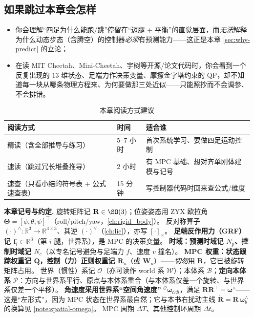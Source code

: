 \subsection*{如果跳过本章会怎样}
\begin{itemize}
  \item 你会理解“四足为什么能跑/跳”停留在“迈腿 + 平衡”的直觉层面，而\emph{无法}解释为什么动态步态（含腾空）的控制器\emph{必须}有预测能力——这正是本章 \cref{sec:why-predict} 的立论；
  \item 在读 MIT Cheetah、Mini-Cheetah、宇树等开源/论文代码时，你会看到一个反复出现的 $13$ 维状态、足端力作决策变量、摩擦金字塔约束的 QP，却不知道每一块从哪条物理方程来、为何要做那三处近似——只能照抄而不会调参、不会排错。
\end{itemize}

\begin{table}[H]\centering\small
\caption{本章阅读方式建议}
\begin{tabular}{lll}
\toprule
阅读方式 & 时间 & 适合谁 \\
\midrule
精读（含全部推导与练习） & 5--7 小时 & 首次系统学习、要做四足运动控制 \\
速读（跳过冗长堆叠推导） & 2 小时 & 有 MPC 基础、想对齐单刚体建模与记号 \\
速查（只看小结的符号表 + 公式速查表） & 15 分钟 & 写控制器代码时回来查公式/维度 \\
\bottomrule
\end{tabular}
\end{table}

\begin{note}
\textbf{本章记号与约定.}\;
旋转矩阵记 $\mathbf{R}\in\SO(3)$；位姿姿态用 ZYX 欧拉角 $\boldsymbol{\Theta}=[\phi,\theta,\psi]^\top$（roll/pitch/yaw，\cref{ch:rigid_body}）。
反对称算子 $(\cdot)^\wedge:\mathbb{R}^3\to\mathbb{R}^{3\times3}$、其逆 $(\cdot)^\vee$（\cref{ch:lie}），亦写 $[\cdot]_\times$。
\textbf{足端反作用力（GRF）记 $\mathbf{f}_i\in\mathbb{R}^3$}（第 $i$ 腿，世界系），是 MPC 的决策变量。
\textbf{时域：预测时域记 $N_p$、控制时域记 $N_c$}（以专名记号避免与足端力 $f$、速度 $v$ 撞名）。
\textbf{MPC 权重：状态跟踪权重记 $\mathbf{Q}$，控制（力）正则权重记 $\mathbf{R}_u$}（或 $\mathbf{W}_u$）——\emph{切勿}用 $\mathbf{R}$，它已被旋转矩阵占用。
世界（惯性）系记 $\mathcal{O}$（亦可读作 world 系 $\mathcal{W}$）；本体系 $\mathcal{B}$；\textbf{定向本体系} $\mathcal{P}$：方向与世界系平行、原点与本体系重合（与本体系仅差一个旋转、与世界系仅差一个平移）。
\textbf{角速度采用世界系“空间角速度”} ${}^{\mathcal{O}}\boldsymbol{\omega}_{\mathcal{OB}}$，满足 $\dot{\mathbf{R}}\mathbf{R}^\top=\boldsymbol{\omega}^\wedge$——这是“左形式”，因为 MPC 状态在世界系最自然；它与本书右扰动主线 $\dot{\mathbf{R}}=\mathbf{R}\,\boldsymbol{\omega}_b^\wedge$ 的换算见 \cref{note:spatial-omega}。
MPC 周期 $\Delta T$、其他控制环周期 $\Delta t$。
\end{note}

